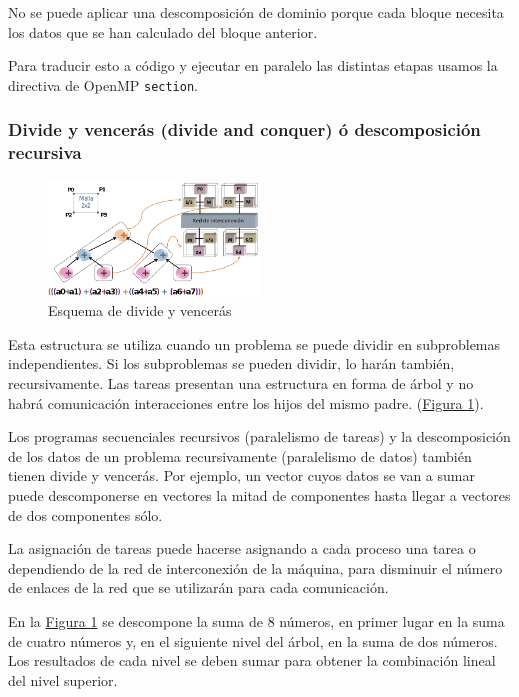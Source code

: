 \documentclass[10pt,a4paper,spanish]{report}
\begin{document}
No se puede aplicar una descomposición de dominio porque cada bloque necesita los datos que se han calculado del bloque anterior.

Para traducir esto a código y ejecutar en paralelo las distintas etapas usamos la directiva de OpenMP \verb*|section|.

\textcolor[rgb]{0.2,0.4,0.8}{\subsubsection{Divide y vencerás (divide and conquer) ó descomposición recursiva}}
\begin{figure}[!h]
    \centering
    \includegraphics[width=0.5\textwidth]{40}
    \caption{Esquema de divide y vencerás}
    \label{divide_conquer}
\end{figure}
Esta estructura se utiliza cuando un problema se puede dividir en subproblemas independientes. Si los subproblemas se pueden dividir, lo harán también, recursivamente. Las tareas presentan una estructura en forma de árbol y no habrá comunicación interacciones entre los hijos del mismo padre. (\hyperref[divide_conquer]{Figura \ref*{divide_conquer}}).

Los programas secuenciales recursivos (paralelismo de tareas) y la descomposición de los datos de un problema recursivamente (paralelismo de datos) también tienen divide y vencerás. Por ejemplo, un vector cuyos datos se van a sumar puede descomponerse en vectores la mitad de componentes hasta llegar a vectores de dos componentes sólo.

La asignación de tareas puede hacerse asignando a cada proceso una tarea o dependiendo de la red de interconexión de la máquina, para disminuir el número de enlaces de la red que se utilizarán para cada comunicación.

En la \hyperref[divide_conquer]{Figura \ref*{divide_conquer}} se descompone la suma de 8 números, en primer lugar en la suma de cuatro números y, en el siguiente nivel del árbol, en la suma de dos números. Los resultados de cada nivel se deben sumar para obtener la combinación lineal del nivel superior.
\end{document}
